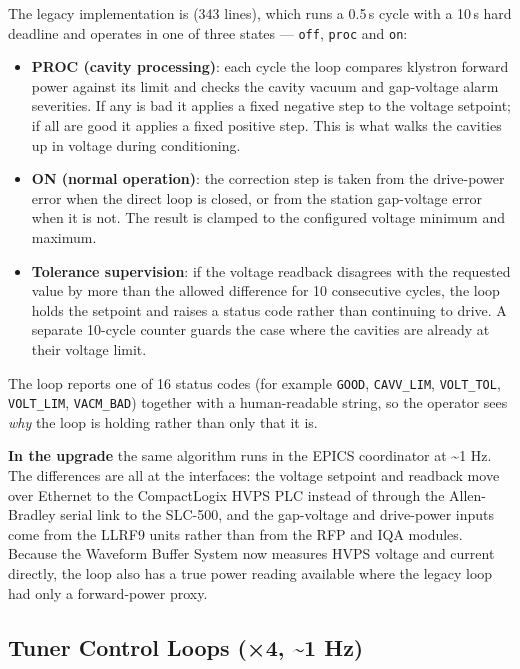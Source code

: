 The legacy implementation is  (343 lines), which runs a 0.5\,s cycle with a 10\,s hard deadline and operates in one of three states --- \texttt{off}, \texttt{proc} and \texttt{on}:

\begin{itemize}
\tightlist
\item
  \textbf{PROC (cavity processing)}: each cycle the loop compares klystron forward power against its limit and checks the cavity vacuum and gap-voltage alarm severities. If any is bad it applies a fixed negative step to the voltage setpoint; if all are good it applies a fixed positive step. This is what walks the cavities up in voltage during conditioning.
\item
  \textbf{ON (normal operation)}: the correction step is taken from the drive-power error when the direct loop is closed, or from the station gap-voltage error when it is not. The result is clamped to the configured voltage minimum and maximum.
\item
  \textbf{Tolerance supervision}: if the voltage readback disagrees with the requested value by more than the allowed difference for 10 consecutive cycles, the loop holds the setpoint and raises a status code rather than continuing to drive. A separate 10-cycle counter guards the case where the cavities are already at their voltage limit.
\end{itemize}

The loop reports one of 16 status codes (for example \texttt{GOOD}, \texttt{CAVV\_LIM}, \texttt{VOLT\_TOL}, \texttt{VOLT\_LIM}, \texttt{VACM\_BAD}) together with a human-readable string, so the operator sees \emph{why} the loop is holding rather than only that it is.

\textbf{In the upgrade} the same algorithm runs in the EPICS coordinator at \textasciitilde1 Hz. The differences are all at the interfaces: the voltage setpoint and readback move over Ethernet to the CompactLogix HVPS PLC instead of through the Allen-Bradley serial link to the SLC-500, and the gap-voltage and drive-power inputs come from the LLRF9 units rather than from the RFP and IQA modules. Because the Waveform Buffer System now measures HVPS voltage and current directly, the loop also has a true power reading available where the legacy loop had only a forward-power proxy.

\subsection{Tuner Control Loops (×4, \textasciitilde1 Hz)}\label{tuner-control-loops-4-1-hz}

